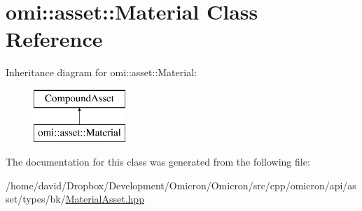 \hypertarget{classomi_1_1asset_1_1_material}{}\section{omi\+:\+:asset\+:\+:Material Class Reference}
\label{classomi_1_1asset_1_1_material}
Inheritance diagram for omi\+:\+:asset\+:\+:Material\+:\begin{figure}[H]
\begin{center}
\leavevmode
\includegraphics[height=2.000000cm]{classomi_1_1asset_1_1_material}
\end{center}
\end{figure}


The documentation for this class was generated from the following file\+:\begin{DoxyCompactItemize}
\item 
/home/david/\+Dropbox/\+Development/\+Omicron/\+Omicron/src/cpp/omicron/api/asset/types/bk/\hyperlink{_material_asset_8hpp}{Material\+Asset.\+hpp}\end{DoxyCompactItemize}
